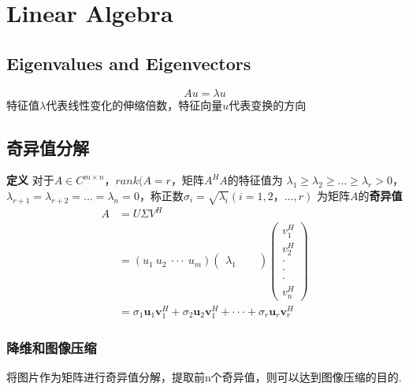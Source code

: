 \chapter{Linear Algebra}

\section{Eigenvalues and Eigenvectors}
\begin{equation}
    Au = \lambda u
\end{equation}
特征值$\lambda$代表线性变化的伸缩倍数，特征向量$u$代表变换的方向

\section{奇异值分解}
\textbf{定义} 对于$A \in C^{m \times n}$，$rank(A = r$，矩阵$A^HA$的特征值为
$\lambda_1 \geqslant \lambda_2 \geqslant ... \geqslant \lambda_r > 0$，
$\lambda_{r+1} = \lambda_{r+2} = ... = \lambda_{n} = 0$，称正数$\sigma_i = \sqrt{\lambda_i}(i = 1,2，...,r) $
为矩阵$A$的\textbf{奇异值}
\\
\begin{equation}
    \begin{split}
        A
        &= U \Sigma V^H \\
        &= (u_1\ u_2\ \cdot \cdot \cdot\ u_m)
        \begin{pmatrix}
            \lambda_1 &  &
        \end{pmatrix}
        \begin{pmatrix}
            v_1^H \\
            v_2^H \\
            \cdot \\
            \cdot \\
            \cdot \\
            v_n^H
        \end{pmatrix}
        \\
        &= \sigma_1 \boldsymbol{u}_1 \boldsymbol{v}_1^H + \sigma_2 \boldsymbol{u}_2 \boldsymbol{v}_1^H + \cdot\cdot\cdot + \sigma_r \boldsymbol{u}_r \boldsymbol{v}_r^H
    \end{split}
\end{equation}

\subsection{降维和图像压缩}
将图片作为矩阵进行奇异值分解，提取前n个奇异值，则可以达到图像压缩的目的.
